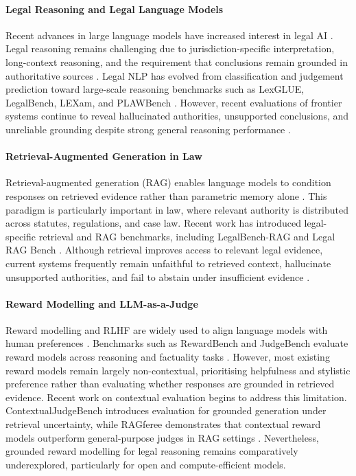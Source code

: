 \documentclass{article}
\theoremstyle{plain}
\theoremstyle{definition}
\theoremstyle{remark}
\begin{document}
\paragraph{Legal Reasoning and Legal Language Models}
Recent advances in large language models have increased interest in legal AI \citep{devlin-etal-2019-bert, openai2024gpt4technicalreport}. Legal reasoning remains challenging due to jurisdiction-specific interpretation, long-context reasoning, and the requirement that conclusions remain grounded in authoritative sources \citep{katz2023naturallanguageprocessinglegal, zhong-etal-2020-nlp}. Legal NLP has evolved from classification and judgement prediction toward large-scale reasoning benchmarks such as LexGLUE, LegalBench, LEXam, and PLAWBench \citep{chalkidis-etal-2022-lexglue, guha2023legalbench, fan2026lexam, shi2026plawbench}. However, recent evaluations of frontier systems continue to reveal hallucinated authorities, unsupported conclusions, and unreliable grounding despite strong general reasoning performance \citep{dahl2024_large_legal_fictions, katz2024gpt}.

\paragraph{Retrieval-Augmented Generation in Law}
Retrieval-augmented generation (RAG) enables language models to condition responses on retrieved evidence rather than parametric memory alone \citep{Lewis_rag2020}. This paradigm is particularly important in law, where relevant authority is distributed across statutes, regulations, and case law. Recent work has introduced legal-specific retrieval and RAG benchmarks, including LegalBench-RAG and Legal RAG Bench \citep{pipitone2024legalbench, butler2026legalragbenchendtoend}. Although retrieval improves access to relevant legal evidence, current systems frequently remain unfaithful to retrieved context, hallucinate unsupported authorities, and fail to abstain under insufficient evidence \citep{butler2026legalragbenchendtoend, peng-etal-2025-unanswerability}.

\paragraph{Reward Modelling and LLM-as-a-Judge}
Reward modelling and RLHF are widely used to align language models with human preferences \citep{Ouyang2022_rlhf, rafailov2023direct}. Benchmarks such as RewardBench and JudgeBench evaluate reward models across reasoning and factuality tasks \citep{lambert-etal-2025-rewardbench, tan2024judgebench}. However, most existing reward models remain largely non-contextual, prioritising helpfulness and stylistic preference rather than evaluating whether responses are grounded in retrieved evidence. Recent work on contextual evaluation begins to address this limitation. ContextualJudgeBench introduces evaluation for grounded generation under retrieval uncertainty, while RAGferee demonstrates that contextual reward models outperform general-purpose judges in RAG settings \citep{xu-etal-2025-context, coman-etal-2025-ragferee}. Nevertheless, grounded reward modelling for legal reasoning remains comparatively underexplored, particularly for open and compute-efficient models.
\end{document}
